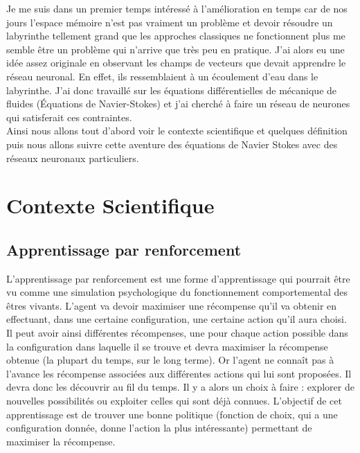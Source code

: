 \documentclass[10pt]{article}
\begin{document}

Je me suis dans un premier temps intéressé à l'amélioration en temps car de nos jours l'espace mémoire n'est pas vraiment un problème et devoir résoudre un labyrinthe tellement grand que les approches classiques ne fonctionnent plus me semble être un problème qui n'arrive que très peu en pratique. J'ai alors eu une idée assez originale en observant les champs de vecteurs que devait apprendre le réseau neuronal. En effet, ils ressemblaient à un écoulement d'eau dans le labyrinthe. J'ai donc travaillé sur les équations différentielles de mécanique de fluides (Équations de Navier-Stokes) et j'ai cherché à faire un réseau de neurones qui satisferait ces contraintes.\\
Ainsi nous allons tout d'abord voir le contexte scientifique et quelques définition puis nous allons suivre cette aventure des équations de Navier Stokes avec des réseaux neuronaux particuliers.

\section{Contexte Scientifique}
\subsection{Apprentissage par renforcement}
L'apprentissage par renforcement est une forme d'apprentissage qui pourrait être vu comme une simulation psychologique du fonctionnement comportemental des êtres vivants. L'agent va devoir maximiser une récompense qu'il va obtenir en effectuant, dans une certaine configuration, une certaine action qu'il aura choisi. Il peut avoir ainsi différentes récompenses, une pour chaque action possible dans la configuration dans laquelle il se trouve et devra maximiser la récompense obtenue (la plupart du temps, sur le long terme). Or l'agent ne connaît pas à l'avance les récompense associées aux différentes actions qui lui sont proposées. Il devra donc les découvrir au fil du temps. Il y a alors un choix à faire : explorer de nouvelles possibilités ou exploiter celles qui sont déjà connues. L'objectif de cet apprentissage est de trouver une bonne politique (fonction de choix, qui a une configuration donnée, donne l'action la plus intéressante) permettant de maximiser la récompense.
\end{document}
